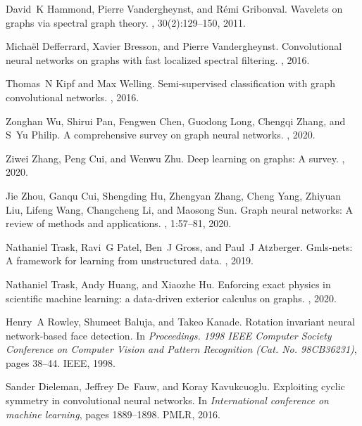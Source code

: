 \documentclass[12pt,reqno]{article}
\begin{document}
\begin{thebibliography}{10}
David~K Hammond, Pierre Vandergheynst, and R{\'e}mi Gribonval.
\newblock Wavelets on graphs via spectral graph theory.
, 30(2):129--150,
2011.

Micha{\"e}l Defferrard, Xavier Bresson, and Pierre Vandergheynst.
\newblock Convolutional neural networks on graphs with fast localized spectral
filtering.
, 2016.

Thomas~N Kipf and Max Welling.
\newblock Semi-supervised classification with graph convolutional networks.
, 2016.

Zonghan Wu, Shirui Pan, Fengwen Chen, Guodong Long, Chengqi Zhang, and S~Yu
Philip.
\newblock A comprehensive survey on graph neural networks.
,
2020.

Ziwei Zhang, Peng Cui, and Wenwu Zhu.
\newblock Deep learning on graphs: A survey.
, 2020.

Jie Zhou, Ganqu Cui, Shengding Hu, Zhengyan Zhang, Cheng Yang, Zhiyuan Liu,
Lifeng Wang, Changcheng Li, and Maosong Sun.
\newblock Graph neural networks: A review of methods and applications.
, 1:57--81, 2020.

Nathaniel Trask, Ravi~G Patel, Ben~J Gross, and Paul~J Atzberger.
\newblock Gmls-nets: A framework for learning from unstructured data.
, 2019.

Nathaniel Trask, Andy Huang, and Xiaozhe Hu.
\newblock Enforcing exact physics in scientific machine learning: a data-driven
exterior calculus on graphs.
, 2020.

Henry~A Rowley, Shumeet Baluja, and Takeo Kanade.
\newblock Rotation invariant neural network-based face detection.
\newblock In {\em Proceedings. 1998 {IEEE} Computer Society Conference on
Computer Vision and Pattern Recognition (Cat. No. 98CB36231)}, pages 38--44.
{IEEE}, 1998.

Sander Dieleman, Jeffrey De~Fauw, and Koray Kavukcuoglu.
\newblock Exploiting cyclic symmetry in convolutional neural networks.
\newblock In {\em International conference on machine learning}, pages
1889--1898. PMLR, 2016.


\end{thebibliography}
\end{document}
